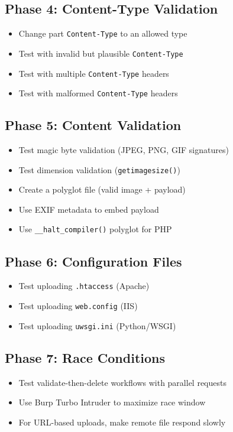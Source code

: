 \documentclass[11pt]{article}
\begin{document}
\begin{checklistbox}
\subsection*{Phase 4: Content-Type Validation}
\begin{itemize}
    \item[$\square$] Change part \texttt{Content-Type} to an allowed type
    \item[$\square$] Test with invalid but plausible \texttt{Content-Type}
    \item[$\square$] Test with multiple \texttt{Content-Type} headers
    \item[$\square$] Test with malformed \texttt{Content-Type} headers
\end{itemize}

\subsection*{Phase 5: Content Validation}
\begin{itemize}
    \item[$\square$] Test magic byte validation (JPEG, PNG, GIF signatures)
    \item[$\square$] Test dimension validation (\texttt{getimagesize()})
    \item[$\square$] Create a polyglot file (valid image + payload)
    \item[$\square$] Use EXIF metadata to embed payload
    \item[$\square$] Use \texttt{\_\_halt\_compiler()} polyglot for PHP
\end{itemize}

\subsection*{Phase 6: Configuration Files}
\begin{itemize}
    \item[$\square$] Test uploading \texttt{.htaccess} (Apache)
    \item[$\square$] Test uploading \texttt{web.config} (IIS)
    \item[$\square$] Test uploading \texttt{uwsgi.ini} (Python/WSGI)
\end{itemize}

\subsection*{Phase 7: Race Conditions}
\begin{itemize}
    \item[$\square$] Test validate-then-delete workflows with parallel requests
    \item[$\square$] Use Burp Turbo Intruder to maximize race window
    \item[$\square$] For URL-based uploads, make remote file respond slowly
\end{itemize}


\end{checklistbox}
\end{document}
